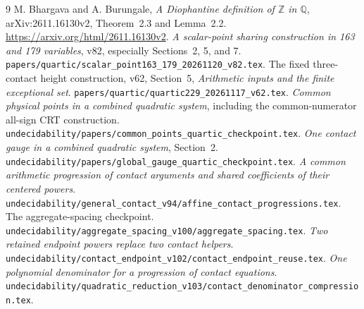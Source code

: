 \documentclass[11pt]{article}
\newcommand{\Q}{\mathbb Q}
\newcommand{\Z}{\mathbb Z}
\begin{document}
\begin{thebibliography}{9}
 M. Bhargava and A. Burungale,
\emph{A Diophantine definition of $\Z$ in $\Q$},
arXiv:2611.16130v2, Theorem~2.3 and Lemma~2.2.
\url{https://arxiv.org/html/2611.16130v2}.
 \emph{A scalar-point sharing construction in 163 and
179 variables}, v82, especially Sections~2, 5, and 7.
\nolinkurl{papers/quartic/scalar_point163_179_20261120_v82.tex}.
 The fixed three-contact height construction, v62,
Section~5, \emph{Arithmetic inputs and the finite exceptional set}.
\nolinkurl{papers/quartic/quartic229_20261117_v62.tex}.
 \emph{Common physical points in a combined quadratic
system}, including the common-numerator all-sign CRT construction.
\nolinkurl{undecidability/papers/common_points_quartic_checkpoint.tex}.
 \emph{One contact gauge in a combined quadratic
system}, Section~2.
\nolinkurl{undecidability/papers/global_gauge_quartic_checkpoint.tex}.
 \emph{A common arithmetic progression of contact
arguments and shared coefficients of their centered powers}.
\nolinkurl{undecidability/general_contact_v94/affine_contact_progressions.tex}.
 The aggregate-spacing checkpoint.
\nolinkurl{undecidability/aggregate_spacing_v100/aggregate_spacing.tex}.
 \emph{Two retained endpoint powers replace two contact
helpers}.
\nolinkurl{undecidability/contact_endpoint_v102/contact_endpoint_reuse.tex}.
 \emph{One polynomial denominator for a progression of
contact equations}.
\nolinkurl{undecidability/quadratic_reduction_v103/contact_denominator_compression.tex}.
\end{thebibliography}
\end{document}
